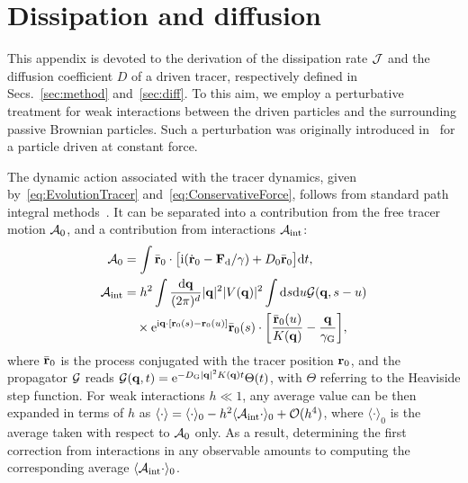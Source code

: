 \documentclass[pre, superscriptaddress, twocolumn,pre]{revtex4-1}
\begin{document}


\appendix

\section{Dissipation and diffusion}\label{app:diff}

This appendix is devoted to the derivation of the dissipation rate $\cal J$ and the diffusion coefficient $D$ of a driven tracer, respectively defined in Secs.~\ref{sec:method} and~\ref{sec:diff}. To this aim, we employ a perturbative treatment for weak interactions between the driven particles and the surrounding passive Brownian particles. Such a perturbation was originally introduced in~\cite{Demery2011, Demery2014} for a particle driven at constant force.


The dynamic action associated with the tracer dynamics, given by~\eqref{eq:EvolutionTracer} and~\eqref{eq:ConservativeForce}, follows from standard path integral methods~\cite{Martin1973, Dominicis1975}. It can be separated into a contribution from the free tracer motion ${\cal A}_0$, and a contribution from interactions ${\cal A}_{\rm int}$:
\begin{equation}\label{eq:action}
	\begin{aligned}
		{\cal A}_0 &= \int \bar{\bf r}_0 \cdot \big[ {\rm i}(\dot{\bf r}_0 - {\bf F}_{\rm d}/\gamma) + D_0 \bar{\bf r}_0 \big] {\rm d}t ,
		\\
		{\cal A}_{\rm int} &= h^2 \int \frac{{\rm d}{\bf q}}{(2\pi)^d} |{\bf q}|^2 |V({\bf q})|^2 \int {\rm d}s{\rm d}u {\cal G}({\bf q},s-u)
		\\
		&\quad\times {\rm e}^{{\rm i}{\bf q}\cdot[{\bf r}_0(s)-{\bf r}_0(u)]} \bar{\bf r}_0(s) \cdot \bigg[ \frac{\bar{\bf r}_0(u)}{K({\bf q})} - \frac{{\bf q}}{\gamma_{\rm G}} \bigg] ,
	\end{aligned}
\end{equation}
where $\bar{\bf r}_0$ is the process conjugated with the tracer position ${\bf r}_0$, and the propagator $\cal G$ reads ${\cal G}({\bf q},t)={\rm e}^{-D_{\rm G}|{\bf q}|^2K({\bf q})t}\Theta(t)$, with $\Theta$ referring to the Heaviside step function. For weak interactions $h\ll1$, any average value can be then expanded in terms of $h$ as $\langle\cdot\rangle=\langle\cdot\rangle_0 - h^2 \langle{\cal A}_{\rm int}\cdot\rangle_0 + {\cal O}(h^4)$, where $\langle\cdot\rangle_0$ is the average taken with respect to ${\cal A}_0$ only. As a result, determining the first correction from interactions in any observable amounts to computing the corresponding average $\langle{\cal A}_{\rm int}\cdot\rangle_0$.
\end{document}
